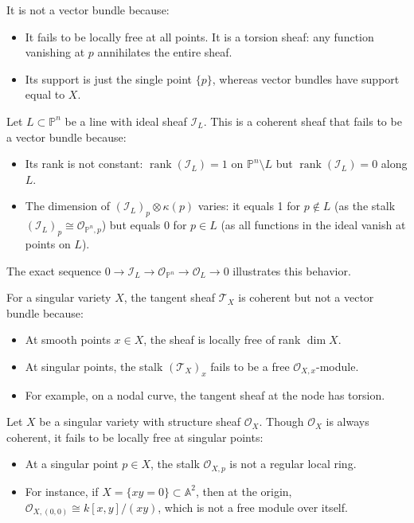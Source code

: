 \documentclass[12pt]{article}
\begin{document}
\begin{example}
    It is not a vector bundle because:
    \begin{itemize}
        \item It fails to be locally free at all points. It is a torsion sheaf: any function vanishing at $p$ annihilates the entire sheaf.
        \item Its support is just the single point $\{p\}$, whereas vector bundles have support equal to $X$.
    \end{itemize}
\end{example}


\begin{example}
    Let $L \subset \mathbb{P}^n$ be a line with ideal sheaf $\mathcal{I}_L$. This is a coherent sheaf that fails to be a vector bundle because:
    \begin{itemize}
        \item Its rank is not constant: $\operatorname{rank}(\mathcal{I}_L) = 1$ on $\mathbb{P}^n \setminus L$ but $\operatorname{rank}(\mathcal{I}_L) = 0$ along $L$.
        \item The dimension of $(\mathcal{I}_L)_p \otimes \kappa(p)$ varies: it equals 1 for $p \not\in L$ (as the stalk $(\mathcal{I}_L)_p \cong \mathcal{O}_{\mathbb{P}^n,p}$) but equals 0 for $p \in L$ (as all functions in the ideal vanish at points on $L$).
    \end{itemize}
    The exact sequence $0 \to \mathcal{I}_L \to \mathcal{O}_{\mathbb{P}^n} \to \mathcal{O}_L \to 0$ illustrates this behavior.
\end{example}

\begin{example}
    For a singular variety $X$, the tangent sheaf $\mathcal{T}_X$ is coherent but not a vector bundle because:
    \begin{itemize}
        \item At smooth points $x \in X$, the sheaf is locally free of rank $\dim X$.
        \item At singular points, the stalk $(\mathcal{T}_X)_x$ fails to be a free $\mathcal{O}_{X,x}$-module.
        \item For example, on a nodal curve, the tangent sheaf at the node has torsion.
    \end{itemize}
\end{example}

\begin{example}
    Let $X$ be a singular variety with structure sheaf $\mathcal{O}_X$. Though $\mathcal{O}_X$ is always coherent, it fails to be locally free at singular points:
    \begin{itemize}
        \item At a singular point $p \in X$, the stalk $\mathcal{O}_{X,p}$ is not a regular local ring.
        \item For instance, if $X = \{xy = 0\} \subset \mathbb{A}^2$, then at the origin, $\mathcal{O}_{X,(0,0)} \cong k[x,y]/(xy)$, which is not a free module over itself.
    \end{itemize}
\end{example}
\end{document}
